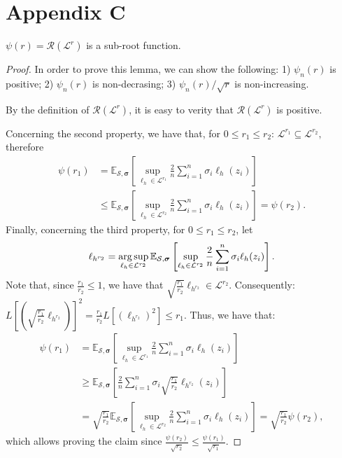 \documentclass[10pt]{llncs}
\newcommand{\argsup}{\operatornamewithlimits{arg\,sup}}
\begin{document}
\section{Appendix C}
\begin{lemma}
  \label{lem-sub-root-Rademacher}
  $
    \psi(r)=\mathcal{R}(\mathcal{L}^r)
  $
  is a sub-root function.
\end{lemma}
\begin{proof}
  In order to prove this lemma, we can show the following:
    1) $\psi_n(r)$ is positive;
    2) $\psi_n(r)$ is non-decrasing;
    3) $\psi_n(r)/\sqrt{r}$ is non-increasing.

  By the definition of $\mathcal{R}(\mathcal{L}^r)$,
  it is easy to verity that $\mathcal{R}(\mathcal{L}^r)$ is positive.

  Concerning the second property, we have that, for $0\leq r_1\leq r_2$:
  $
    \mathcal{L}^{r_1}\subseteq \mathcal{L}^{r_2},
  $
  therefore
  \begin{align*}
    \psi(r_1)&=\mathbb{E}_{\mathcal{S},\bm \sigma}
      \left[\sup_{\ell_h\in\mathcal{L}^{r_1}}\frac{2}{n}
      \sum_{i=1}^{n}\sigma_i\ell_h(z_i)
          \right]\\
    &\leq \mathbb{E}_{\mathcal{S},\bm \sigma}
      \left[\sup_{\ell_h\in\mathcal{L}^{r_2}}\frac{2}{n}
      \sum_{i=1}^{n}\sigma_i\ell_h(z_i)
          \right]=\psi(r_2).
  \end{align*}
  Finally, concerning the third property,
  for $0\leq r_1\leq r_2$,
  let
  \begin{align*}
    \ell_{h^{r_2}}
    =\argsup_{\ell_h\in\mathcal{L}^{r_2}}
    \mathbb{E}_{\mathcal{S},\bm \sigma}
      \left[\sup_{\ell_h\in\mathcal{L}^{r_2}}\frac{2}{n}
      \sum_{i=1}^{n}\sigma_i\ell_h(z_i)
          \right].
  \end{align*}
  Note that, since $\frac{r_1}{r_2}\leq 1$,
  we have that $\sqrt{\frac{r_1}{r_2}}\ell_{h^{r_2}}\in \mathcal{L}^{r_2}$.
  Consequently:
  $
    L\left[
    \left(\sqrt{\frac{r_1}{r_2}}\ell_{h^{r_2}}\right)\right]^2
    =\frac{r_1}{r_2}L\left[(\ell_{h^{r_2}})^2\right]\leq r_1.
  $
  Thus, we have that:
  \begin{align*}
    \psi(r_1)&=\mathbb{E}_{\mathcal{S},\bm \sigma}
      \left[\sup_{\ell_h\in\mathcal{L}^{r_1}}\frac{2}{n}
      \sum_{i=1}^{n}\sigma_i\ell_h(z_i)
          \right]\\
    &\geq \mathbb{E}_{\mathcal{S},\bm \sigma}\left[
    \frac{2}{n}
      \sum_{i=1}^{n}
      \sigma_i\sqrt{\frac{r_1}{r_2}}\ell_{h^{r_2}}(z_i)\right]
  \\
    &=\sqrt{\frac{r_1}{r_2}}\mathbb{E}_{\mathcal{S},\bm \sigma}
      \left[\sup_{\ell_h\in\mathcal{L}^{r_2}}\frac{2}{n}
      \sum_{i=1}^{n}\sigma_i\ell_h(z_i)
          \right]
    =\sqrt{\frac{r_1}{r_2}}\psi(r_2),
  \end{align*}
  which allows proving the claim since
  $
    \frac{\psi(r_2)}{\sqrt{r_2}}
    \leq \frac{\psi(r_1)}{\sqrt{r_1}}.
  $
\end{proof}
\end{document}
